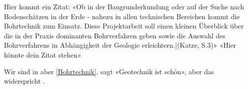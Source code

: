 Hier kommt ein Zitat: «Ob in der Baugrunderkundung oder auf der Suche nach Bodenschätzen in der Erde - nahezu in allen technischen Bereichen kommt die Bohrtechnik zum Einsatz. Diese Projektarbeit soll einen kleinen Überblick über die in der Praxis dominanten Bohrverfahren geben sowie die Auswahl des Bohrverfahrens in Abhängigkeit der Geologie erleichtern.|(Katze, S.3)» «Hier könnte dein Zitat stehen» 

Wir sind in  aber \cref{Bohrtechnik}. \textcite{ziegler2012geotechnische} sagt «Geotechnik ist schön», aber das widerspricht \cite{ziegler2012geotechnische}.